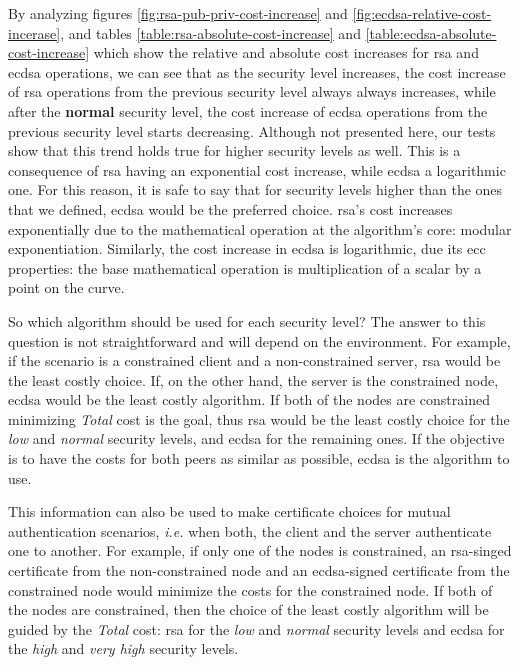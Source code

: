 By analyzing figures \ref{fig:rsa-pub-priv-cost-increase} and \ref{fig:ecdsa-relative-cost-incerase}, and tables \ref{table:rsa-absolute-cost-increase} and
\ref{table:ecdsa-absolute-cost-increase} which show the relative and absolute cost increases for \gls{rsa} and \gls{ecdsa} operations,
we can see that as the security level increases, the cost increase of \gls{rsa} operations from the previous security level always always increases, 
while after the \textbf{normal} security level, the cost increase of \gls{ecdsa} operations from the previous security level starts decreasing.
Although not presented here,  our tests show that this trend holds true
for higher security levels as well. This is a consequence of \gls{rsa} having an exponential cost increase, while \gls{ecdsa} a logarithmic one.
For this reason, it is safe to say that for security levels higher than the ones that we defined, \gls{ecdsa} would be the preferred choice.
\gls{rsa}'s cost increases exponentially due to the mathematical operation at the algorithm's core: modular exponentiation. Similarly, the cost
increase in \gls{ecdsa} is logarithmic, due its \gls{ecc} properties: the base mathematical operation is multiplication of a scalar by a point on the
curve.

So which algorithm should be used for each security level? The answer to this question is not straightforward and will depend on the environment.
For example, if the scenario is a constrained client and a non-constrained server, \gls{rsa} would be the least costly choice. If, on the
other hand, the server is the constrained node, \gls{ecdsa} would be the least costly algorithm. If both of the nodes are
constrained minimizing \textit{Total} cost is the goal, thus \gls{rsa} would be the least costly choice for the \textit{low} and 
\textit{normal} security levels, and \gls{ecdsa} for the remaining ones. If the objective is to have the costs for both peers as similar as 
possible, \gls{ecdsa} is the algorithm to use.

This information can also be used to make
certificate choices for mutual authentication scenarios, \textit{i.e.} when both, the client and the server authenticate one to another.
For example, if only one of the nodes is constrained, an \gls{rsa}-singed certificate from the non-constrained node and an \gls{ecdsa}-signed
certificate from the constrained node would minimize the costs for the constrained node. If both of the nodes are constrained, then the
choice of the least costly algorithm will be guided by the \textit{Total} cost: \gls{rsa} for the \textit{low} and \textit{normal}
security levels and \gls{ecdsa} for the \textit{high} and \textit{very high} security levels.


